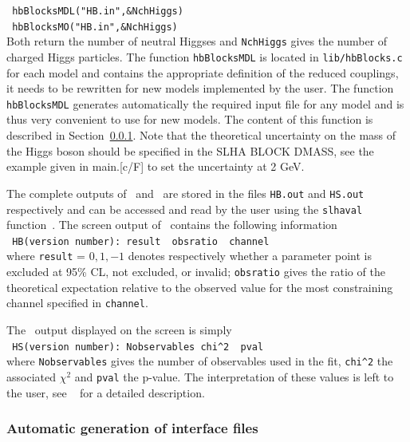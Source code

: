 \documentclass[12pt,a4paper]{article}
\begin{document}
{\noindent
\verb| hbBlocksMDL("HB.in",&NchHiggs) | \\
\verb| hbBlocksMO("HB.in",&NchHiggs) | \\

Both return the  number of neutral Higgses and {\tt NchHiggs} gives the number of charged Higgs particles.
The function \verb|hbBlocksMDL|  is located in  \verb|lib/hbBlocks.c| for each model and contains the appropriate definition of the reduced couplings, it needs to be rewritten for new models implemented by the user. The function \verb|hbBlocksMDL|  generates automatically the required input file for any model and is thus very convenient to use  for new  models. 
The content of this function is described in Section~\ref{sec:auto}. 
Note that the theoretical uncertainty  on the  mass of the Higgs boson should be specified in the SLHA BLOCK DMASS, see the example given in  main.[c/F] to set the uncertainty at 2 GeV.

%
The complete outputs of \HB\ and \HS\ are stored in the files  \verb|HB.out| and \verb|HS.out| respectively and can be accessed  and read  by the user using the \verb|slhaval| function~\cite{Belanger:2014hqa}.
The screen output of \micro\ contains the following information\\
 
\verb| HB(version number): result  obsratio  channel |\\
 
\noindent
where \verb|result| = $0,1,-1$ denotes respectively whether a parameter point is excluded at 95\% CL, not excluded, or invalid; \verb|obsratio| gives the ratio of the theoretical expectation relative to the observed value  for the most constraining channel specified in \verb|channel|. 


The \HS\ output displayed on the screen is simply \\

\verb| HS(version number): Nobservables chi^2  pval|\\

\noindent
where \verb|Nobservables| gives the number of observables used in the fit, \verb|chi^2| the associated $\chi^2$ and \verb|pval| the p-value. 
The interpretation of these values is left to the user, see ~\cite{Bechtle:2013xfa} for a detailed description.


\subsubsection{Automatic generation of interface files}
\label{sec:auto}

}
\end{document}
